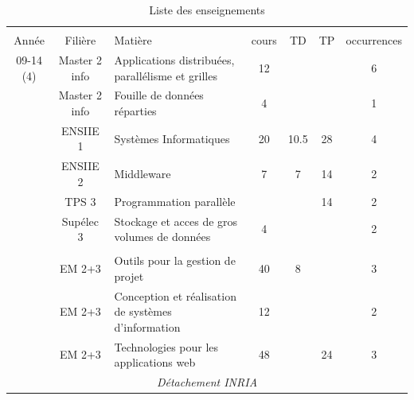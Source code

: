 \documentclass[11pt]{article}
\begin{document}
\begin{table}[H]
\caption{Liste des enseignements}
\begin{center}
{\footnotesize
\noindent \begin{tabular}{|c|c|p{6cm}|c|c|c|c|} \hline &&&&&\\[-8pt]

Année & Filière & Matière & cours & TD & TP &  occurrences \\[5pt] \hline
 
\hline
09-14 (4)
	& Master 2 info		& Applications distribuées, parallélisme et grilles	&  12	&   &   & 6 \\
	& Master 2 info		& Fouille de données réparties			        &  4	&   &   & 1 \\
	& ENSIIE 1		& Systèmes Informatiques				& 20	& 10.5 & 28 & 4 \\ 
        & ENSIIE 2              & Middleware                                            &  7    &   7  & 14 & 2 \\
        & TPS    3              & Programmation parallèle                               &       &      & 14 & 2 \\
        & Supélec 3             & Stockage et acces de gros volumes de données          &  4    &      &    & 2 \\                    
&&&&&&\\
	& EM 2+3		& Outils pour la gestion de projet			&  40	& 8 &   & 3 \\
	& EM 2+3		& Conception et réalisation de systèmes d'information	&  12	&   &   & 2 \\
	& EM 2+3		& Technologies pour les applications web		&  48	&   & 24& 3 \\
\hline
\multicolumn{7}{|c|}{\textit{Détachement INRIA}}\\  \hline
	

\end{tabular}}
\end{center}
\end{table}
\end{document}
